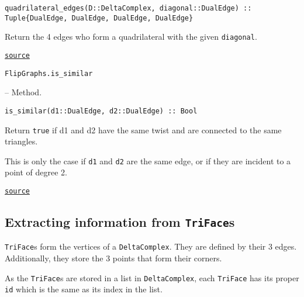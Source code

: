 \begin{adjustwidth}{2em}{0pt}


\begin{verbatim}
quadrilateral_edges(D::DeltaComplex, diagonal::DualEdge) :: Tuple{DualEdge, DualEdge, DualEdge, DualEdge}
\end{verbatim}

Return the 4 edges who form a quadrilateral with the given \texttt{diagonal}.



\href{https://github.com/schto223/FlipGraphs.jl/blob/e35d43698a06b86273148826b79d585ba04fcd26/src/deltaComplex.jl#L980-L984}{\texttt{source}}


\end{adjustwidth}
\hypertarget{18090201370347779315}{\texttt{FlipGraphs.is\_similar}}  -- {Method.}

\begin{adjustwidth}{2em}{0pt}


\begin{verbatim}
is_similar(d1::DualEdge, d2::DualEdge) :: Bool
\end{verbatim}

Return \texttt{true} if d1 and d2 have the same twist and are connected to the same triangles.

This is only the case if \texttt{d1} and \texttt{d2} are the same edge, or if they are incident to a point of degree 2.



\href{https://github.com/schto223/FlipGraphs.jl/blob/e35d43698a06b86273148826b79d585ba04fcd26/src/deltaComplex.jl#L141-L147}{\texttt{source}}


\end{adjustwidth}

\subsection{Extracting information from \texttt{TriFace}s}



\label{17925776943648899087}{}


\texttt{TriFace}s form the vertices of a \texttt{DeltaComplex}. They are defined by their 3 edges. Additionally, they store the 3 points that form their corners.



As the \texttt{TriFace}s are stored in a list in \texttt{DeltaComplex}, each \texttt{TriFace} has its proper \texttt{id} which is the same as its index in the list.


